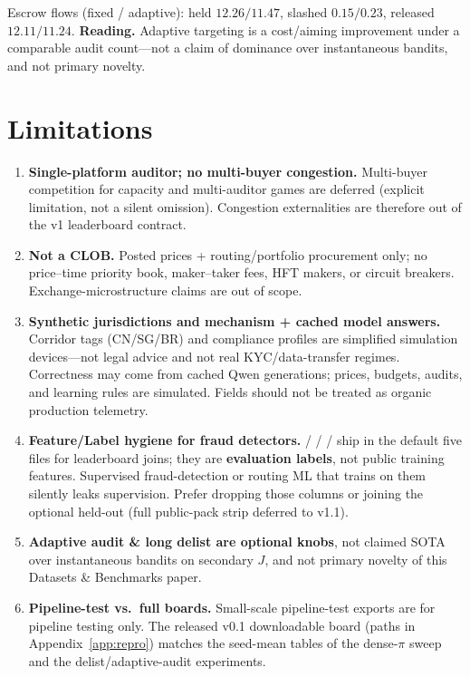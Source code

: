 \documentclass[sigconf,review]{acmart}
\begin{document}
Escrow flows (fixed / adaptive): held $12.26 / 11.47$, slashed $0.15 / 0.23$, released $12.11 / 11.24$. \textbf{Reading.} Adaptive targeting is a cost/aiming improvement under a comparable audit count---not a claim of dominance over instantaneous bandits, and not primary novelty.

\section{Limitations}
\label{sec:limitations}

\begin{enumerate}
\item \textbf{Single-platform auditor; no multi-buyer congestion.} Multi-buyer competition for capacity and multi-auditor games are deferred (explicit limitation, not a silent omission). Congestion externalities are therefore out of the v1 leaderboard contract.
\item \textbf{Not a CLOB.} Posted prices + routing/portfolio procurement only; no price--time priority book, maker--taker fees, HFT makers, or circuit breakers. Exchange-microstructure claims are out of scope.
\item \textbf{Synthetic jurisdictions and mechanism + cached model answers.} Corridor tags (CN/SG/BR) and compliance profiles are simplified simulation devices---not legal advice and not real KYC/data-transfer regimes. Correctness may come from cached Qwen generations; prices, budgets, audits, and learning rules are simulated. Fields should not be treated as organic production telemetry.
\item \textbf{Feature/Label hygiene for fraud detectors.}  /  /  /  ship in the default five files for leaderboard joins; they are \textbf{evaluation labels}, not public training features. Supervised fraud-detection or routing ML that trains on them silently leaks supervision. Prefer dropping those columns or joining the optional held-out  (full public-pack strip deferred to v1.1).
\item \textbf{Adaptive audit \& long delist are optional knobs}, not claimed SOTA over instantaneous bandits on secondary $J$, and not primary novelty of this Datasets \& Benchmarks paper.
\item \textbf{Pipeline-test vs.\ full boards.} Small-scale pipeline-test exports are for pipeline testing only. The released v0.1 downloadable board (paths in Appendix~\ref{app:repro}) matches the seed-mean tables of the dense-$\pi$ sweep and the delist/adaptive-audit experiments.

\end{enumerate}
\end{document}
